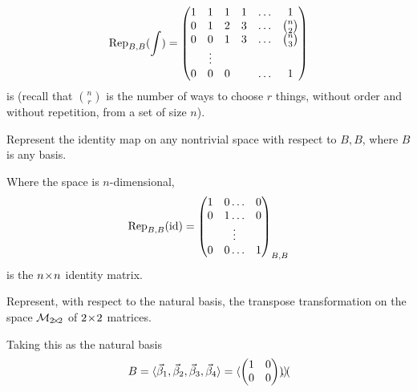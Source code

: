 \begin{exercises}
\begin{answer}
\begin{exparts}
\begin{equation*}
            \rep{\int}{B,B}
            =\begin{pmatrix}
              1  &1   &1  &1  &\ldots  &1           \\
              0  &1   &2  &3  &\ldots  &\binom{n}{2}  \\
              0  &0   &1  &3  &\ldots  &\binom{n}{3}  \\
                 &\vdots                        \\
              0  &0   &0  &   &\ldots  &1
            \end{pmatrix}
          \end{equation*}
          is 
          (recall that $\binom{n}{r}$ is the number of ways to choose $r$
          things, without order and without repetition,
          from a set of size $n$). 
      \end{exparts}  
    \end{answer}
  \item 
    Represent the identity map on any nontrivial
    space with respect to \( B,B \), where \( B \) is any basis.
    \begin{answer}
      Where the space is \( n \)-dimensional,
      \begin{equation*}
        \rep{\text{id}}{B,B}=
        \begin{pmatrix}
          1  &0  \ldots  &0  \\
          0  &1  \ldots  &0  \\
             &\vdots         \\
          0  &0  \ldots  &1
        \end{pmatrix}_{B,B}
      \end{equation*}
      is the $\nbyn{n}$ identity matrix.  
    \end{answer}
  \item 
    Represent, with respect to the natural basis, 
    the transpose transformation on the space 
    \( \matspace_{\nbyn{2}} \) of $\nbyn{2}$ matrices.
    \begin{answer}
      Taking this as the natural basis
      \begin{equation*}
        B=\sequence{\vec{\beta}_1,\vec{\beta}_2,\vec{\beta}_3,\vec{\beta}_4}
         =\sequence{
            \begin{pmatrix}
              1  &0  \\
              0  &0
            \end{pmatrix},
            \begin{pmatrix}

\end{pmatrix}}
\end{equation*}
\end{answer}
\end{exercises}
